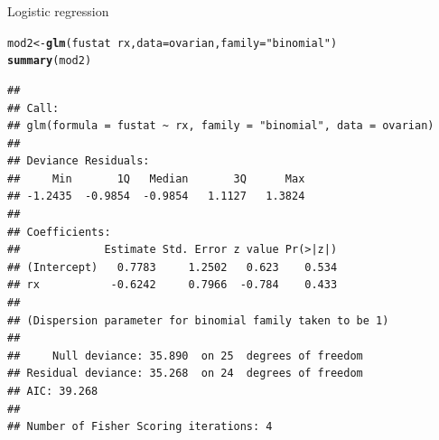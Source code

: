 \documentclass[10pt,xcolor=dvipsnames]{beamer}\usepackage[]{graphicx}\usepackage[]{color}
\makeatletter
\newcommand{\hlstr}[1]{\textcolor[rgb]{0.192,0.494,0.8}{#1}}%
\newcommand{\hlopt}[1]{\textcolor[rgb]{0,0,0}{#1}}%
\newcommand{\hlstd}[1]{\textcolor[rgb]{0.345,0.345,0.345}{#1}}%
\newcommand{\hlkwb}[1]{\textcolor[rgb]{0.69,0.353,0.396}{#1}}%
\newcommand{\hlkwc}[1]{\textcolor[rgb]{0.333,0.667,0.333}{#1}}%
\newcommand{\hlkwd}[1]{\textcolor[rgb]{0.737,0.353,0.396}{\textbf{#1}}}%
\newenvironment{kframe}{%
 \def\at@end@of@kframe{}%
 \ifinner\ifhmode%
  \def\at@end@of@kframe{\end{minipage}}%
  \begin{minipage}{\columnwidth}%
 \fi\fi%
 \def\FrameCommand##1{\hskip\@totalleftmargin \hskip-\fboxsep
 \colorbox{shadecolor}{##1}\hskip-\fboxsep
     \hskip-\linewidth \hskip-\@totalleftmargin \hskip\columnwidth}%
 \MakeFramed {\advance\hsize-\width
   \@totalleftmargin\z@ \linewidth\hsize
   \@setminipage}}%
 {\par\unskip\endMakeFramed%
 \at@end@of@kframe}
\newenvironment{knitrout}{}{} %
\makeatother
\begin{document}
\begin{frame}[fragile]{Logistic regression}

\scriptsize
\begin{knitrout}
\color{fgcolor}\begin{kframe}
\begin{alltt}
\hlstd{mod2} \hlkwb{<-} \hlkwd{glm}\hlstd{(fustat} \hlopt{~} \hlstd{rx,} \hlkwc{data}\hlstd{=ovarian,} \hlkwc{family}\hlstd{=}\hlstr{"binomial"}\hlstd{)}
\hlkwd{summary}\hlstd{(mod2)}
\end{alltt}
\begin{verbatim}
## 
## Call:
## glm(formula = fustat ~ rx, family = "binomial", data = ovarian)
## 
## Deviance Residuals: 
##     Min       1Q   Median       3Q      Max  
## -1.2435  -0.9854  -0.9854   1.1127   1.3824  
## 
## Coefficients:
##             Estimate Std. Error z value Pr(>|z|)
## (Intercept)   0.7783     1.2502   0.623    0.534
## rx           -0.6242     0.7966  -0.784    0.433
## 
## (Dispersion parameter for binomial family taken to be 1)
## 
##     Null deviance: 35.890  on 25  degrees of freedom
## Residual deviance: 35.268  on 24  degrees of freedom
## AIC: 39.268
## 
## Number of Fisher Scoring iterations: 4
\end{verbatim}
\end{kframe}
\end{knitrout}

\normalsize
\end{frame}
\end{document}
